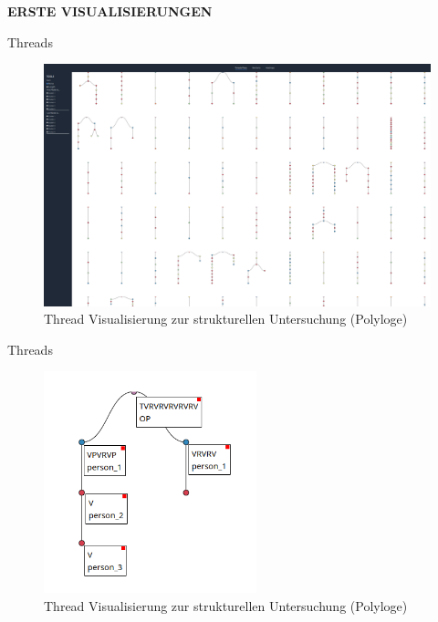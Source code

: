 \documentclass[compress,12pt]{beamer}
\begin{document}
    \begin{frame}
        \centering
        \textbf{ERSTE VISUALISIERUNGEN}
    \end{frame}

    \begin{frame}{Threads}
        \begin{figure}
            \centering
            \includegraphics[width=\textwidth]{../images/threads-example}
            \caption{Thread Visualisierung zur strukturellen Untersuchung (Polyloge)}
            \label{fig:thread-example}
        \end{figure}
    \end{frame}

    \begin{frame}{Threads}
        \begin{figure}
            \centering
            \includegraphics[width=0.55\textwidth]{../images/single-thread-example}
            \caption{Thread Visualisierung zur strukturellen Untersuchung (Polyloge)}
            \label{fig:single-thread-example}
        \end{figure}
    \end{frame}
\end{document}
